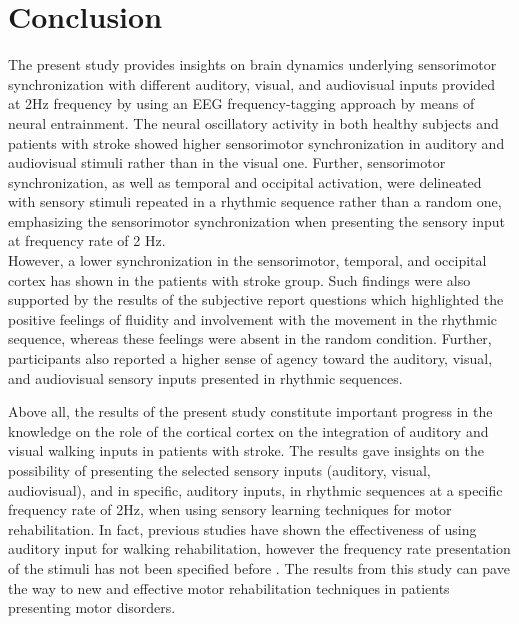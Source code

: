 \chapter{Conclusion}
The present study provides insights on brain dynamics underlying sensorimotor synchronization with different auditory, visual, and audiovisual inputs provided at 2Hz frequency by using an EEG frequency-tagging approach by means of neural entrainment. The neural oscillatory activity in both healthy subjects and patients with stroke showed higher sensorimotor synchronization in auditory and audiovisual stimuli rather than in the visual one. Further, sensorimotor synchronization, as well as temporal and occipital activation, were delineated with sensory stimuli repeated in a rhythmic sequence rather than a random one, emphasizing the sensorimotor synchronization when presenting the sensory input at frequency rate of 2 Hz. \\
However, a lower synchronization in the sensorimotor, temporal, and occipital cortex has shown in the patients with stroke group. Such findings were also supported by the results of the subjective report questions which highlighted the positive feelings of fluidity and involvement with the movement in the rhythmic sequence, whereas these feelings were absent in the random condition. Further, participants also reported a higher sense of agency toward the auditory, visual, and audiovisual sensory inputs presented in rhythmic sequences. 

Above all, the results of the present study constitute important progress in the knowledge on the role of the cortical cortex on the integration of auditory and visual walking inputs in patients with stroke. The results gave insights on the possibility of presenting the selected sensory inputs (auditory, visual, audiovisual), and in specific, auditory inputs, in rhythmic sequences at a specific frequency rate of 2Hz, when using sensory learning techniques for motor rehabilitation. In fact, previous studies have shown the effectiveness of using auditory input for walking rehabilitation, however the frequency rate presentation of the stimuli has not been specified before \parencite{Bolognini_2016, Gomez_2020}. The results from this study can pave the way to new and effective motor rehabilitation techniques in patients presenting motor disorders. 

